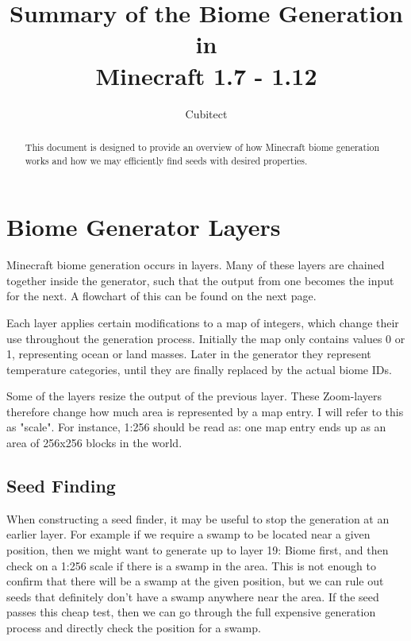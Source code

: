 \documentclass{article}
\title{Summary of the Biome Generation in \\ Minecraft 1.7 - 1.12}
\author{Cubitect}
\begin{document}
	\maketitle

	\begin{abstract}
		This document is designed to provide an overview of how Minecraft biome generation works and how we may efficiently find seeds with desired properties.
	\end{abstract}

	\newpage

	\tableofcontents



	\newpage


	\section{Biome Generator Layers}

	Minecraft biome generation occurs in layers. Many of these layers are chained together inside the generator, such that the output from one becomes the input for the next. A flowchart of this can be found on the next page.

	Each layer applies certain modifications to a map of integers, which change their use throughout the generation process. Initially the map only contains values 0 or 1, representing ocean or land masses. Later in the generator they represent temperature categories, until they are finally replaced by the actual biome IDs.

	Some of the layers resize the output of the previous layer. These Zoom-layers therefore change how much area is represented by a map entry. I will refer to this as "scale". For instance, 1:256 should be read as: one map entry ends up as an area of 256x256 blocks in the world.

	\setcounter{subsection}{-1}
	\subsection{Seed Finding}

	When constructing a seed finder, it may be useful to stop the generation at an earlier layer. For example if we require a swamp to be located near a given position, then we might want to generate up to layer 19: Biome first, and then check on a 1:256 scale if there is a swamp in the area. This is not enough to confirm that there will be a swamp at the given position, but we can rule out seeds that definitely don't have a swamp anywhere near the area. If the seed passes this cheap test, then we can go through the full expensive generation process and directly check the position for a swamp.
\end{document}
